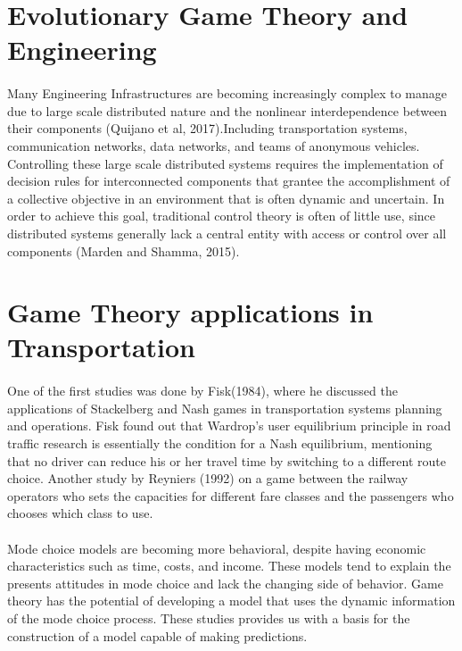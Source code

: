 \section{Evolutionary Game Theory and Engineering}
\paragraph{}Many Engineering Infrastructures are becoming increasingly complex to manage due to large scale distributed nature and the nonlinear interdependence between their components (Quijano et al, 2017).Including transportation systems, communication networks, data networks, and teams of anonymous vehicles. Controlling these large scale distributed systems requires the implementation of decision rules for interconnected components that grantee the accomplishment of a collective objective in an environment that is often dynamic and uncertain. In order to achieve this goal, traditional control theory is often of little use, since distributed systems generally lack a central  entity with access or control over all components (Marden and Shamma, 2015).
\section{Game Theory applications in Transportation}
\paragraph{} One of the first studies was done by Fisk(1984), where he discussed the applications of Stackelberg and Nash games in transportation systems planning and operations. Fisk found out that Wardrop's user equilibrium principle in road traffic research is essentially the condition for a Nash equilibrium, mentioning that no driver can reduce his or her travel time by switching to a different route choice. Another study by Reyniers (1992) on a game between the railway operators who sets the capacities for different fare classes and the passengers who chooses which class to use.
\
\paragraph{}
Mode choice models are becoming more behavioral, despite having economic characteristics such as time, costs, and income.  These models tend to explain the presents attitudes in mode choice and lack the changing side of behavior. Game theory has the potential of developing a model that uses the dynamic information of the mode choice process. These studies provides us with a basis for the construction of a model capable of making predictions.